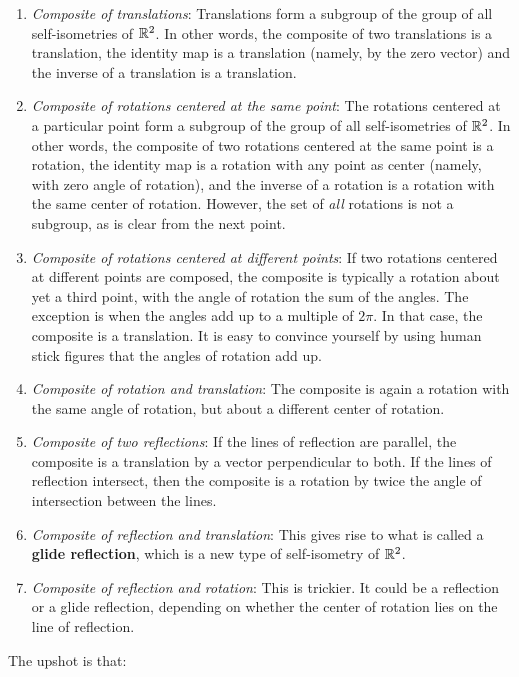 \documentclass[10pt]{amsart}
\begin{document}
\begin{enumerate}
\item {\em Composite of translations}: Translations form a subgroup of
  the group of all self-isometries of $\mathbb{R}^2$. In other words, the
  composite of two translations is a translation, the identity map is
  a translation (namely, by the zero vector) and the inverse of a
  translation is a translation.
\item {\em Composite of rotations centered at the same point}: The
  rotations centered at a particular point form a subgroup of the
  group of all self-isometries of $\mathbb{R}^2$. In other words, the
  composite of two rotations centered at the same point is a rotation,
  the identity map is a rotation with any point as center (namely,
  with zero angle of rotation), and the inverse of a rotation is a
  rotation with the same center of rotation. However, the set of {\em
    all} rotations is not a subgroup, as is clear from the next point.
\item {\em Composite of rotations centered at different points}: If
  two rotations centered at different points are composed, the
  composite is typically a rotation about yet a third point, with the
  angle of rotation the sum of the angles. The exception is when the
  angles add up to a multiple of $2\pi$. In that case, the composite
  is a translation. It is easy to convince yourself by using human
  stick figures that the angles of rotation add up.
\item {\em Composite of rotation and translation}: The composite is
  again a rotation with the same angle of rotation, but about a
  different center of rotation.
\item {\em Composite of two reflections}: If the lines of reflection
  are parallel, the composite is a translation by a vector
  perpendicular to both. If the lines of reflection intersect, then
  the composite is a rotation by twice the angle of intersection
  between the lines.
\item {\em Composite of reflection and translation}: This gives rise
  to what is called a {\bf glide reflection}, which is a new type of
  self-isometry of $\mathbb{R}^2$.
\item {\em Composite of reflection and rotation}: This is trickier. It
  could be a reflection or a glide reflection, depending on whether
  the center of rotation lies on the line of reflection.
\end{enumerate}

The upshot is that:
\end{document}
